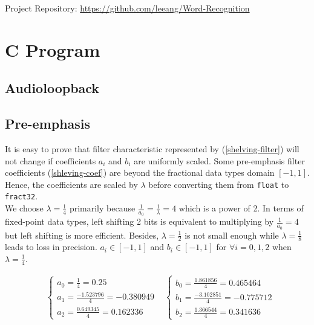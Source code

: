 Project Repository: \url{https://github.com/leeang/Word-Recognition}


\section{C Program}
\label{section:c_program}

\subsection{Audioloopback}


\subsection{Pre-emphasis}

It is easy to prove that filter characteristic represented by (\ref{shelving-filter}) will not change if coefficients $a_i$ and $b_i$ are uniformly scaled. Some pre-emphasis filter coefficients (\ref{shleving-coef}) are beyond the fractional data types domain $[-1, 1]$. Hence, the coefficients are scaled by $\lambda$ before converting them from \texttt{float} to \texttt{fract32}.\\

We choose $\lambda = \frac{1}{4}$ primarily because $\frac{1}{a_0} = \frac{1}{\lambda} = 4$ which is a power of 2. In terms of fixed-point data types, left shifting 2 bits is equivalent to multiplying by $\frac{1}{a_0} = 4$ but left shifting is more efficient. Besides, $\lambda = \frac{1}{2}$ is not small enough while $\lambda = \frac{1}{8}$ leads to loss in precision. $a_i \in [-1, 1]$ and $b_i \in [-1, 1]$ for $\forall i = 0, 1, 2$ when $\lambda = \frac{1}{4}$.

\begin{align*}
&\begin{cases}
a_0 = \frac{1}{4} = 0.25\\
a_1 = \frac{-1.523796}{4} = -0.380949\\
a_2 = \frac{0.649345}{4} = 0.162336
\end{cases}
&\begin{cases}
b_0 = \frac{1.861856}{4} = 0.465464\\
b_1 = \frac{-3.102851}{4} = -0.775712\\
b_2 = \frac{1.366544}{4} = 0.341636
\end{cases}
\end{align*}

